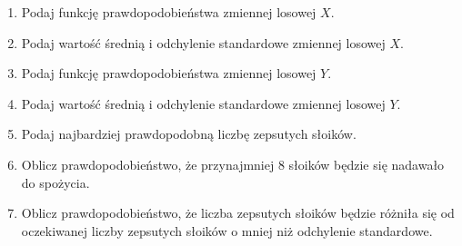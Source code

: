 \documentclass{mwart}
\begin{document}
\begin{enumerate}
\begin{enumerate}
\item Podaj funkcję prawdopodobieństwa zmiennej losowej $X$.
\item Podaj wartość średnią i odchylenie standardowe zmiennej losowej $X$.
\item Podaj funkcję prawdopodobieństwa zmiennej losowej $Y$.
\item Podaj wartość średnią i odchylenie standardowe zmiennej losowej $Y$.
\item Podaj najbardziej prawdopodobną liczbę zepsutych słoików.
\item Oblicz prawdopodobieństwo, że przynajmniej 8 słoików będzie się nadawało do spożycia.
\item Oblicz prawdopodobieństwo, że liczba zepsutych słoików będzie różniła się od oczekiwanej liczby zepsutych słoików o mniej niż odchylenie standardowe.
\end{enumerate}


\end{enumerate}
\vfill
\end{document}
